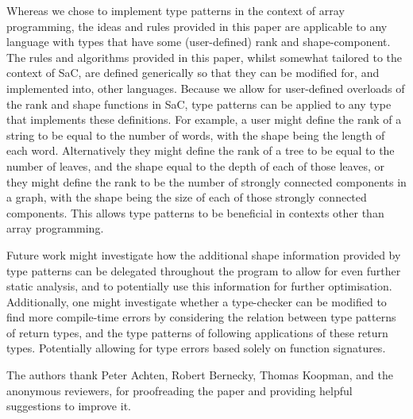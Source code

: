 \documentclass[sigconf,screen]{acmart}
\begin{document}
Whereas we chose to implement type patterns in the context of array programming, the ideas and rules provided in this paper are applicable to any language with types that have some (user-defined) rank and shape-component.
The rules and algorithms provided in this paper, whilst somewhat tailored to the context of SaC, are defined generically so that they can be modified for, and implemented into, other languages.
Because we allow for user-defined overloads of the rank and shape functions in SaC, type patterns can be applied to any type that implements these definitions.
For example, a user might define the rank of a string to be equal to the number of words, with the shape being the length of each word.
Alternatively they might define the rank of a tree to be equal to the number of leaves, and the shape equal to the depth of each of those leaves, or they might define the rank to be the number of strongly connected components in a graph, with the shape being the size of each of those strongly connected components.
This allows type patterns to be beneficial in contexts other than array programming.

Future work might investigate how the additional shape information provided by type patterns can be delegated throughout the program to allow for even further static analysis, and to potentially use this information for further optimisation.
Additionally, one might investigate whether a type-checker can be modified to find more compile-time errors by considering the relation between type patterns of return types, and the type patterns of following applications of these return types.
Potentially allowing for type errors based solely on function signatures.

\begin{acks}
The authors thank Peter Achten, Robert Bernecky, Thomas Koopman, and the anonymous reviewers, for proofreading the paper and providing helpful suggestions to improve it.
\end{acks}



\end{document}
